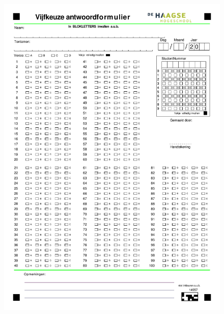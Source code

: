 \documentclass[a4paper,12pt,fleqn,dutch,mimicwordtwentyten]{tisdexam}
\begin{document}
\begin{figure}[h!]
  \centering
  \includegraphics*[viewport=0 500 600 850,scale=0.80]{vijfkeuze_nl.pdf}
\end{figure}
\centering{***********************************************************}
\end{document}

